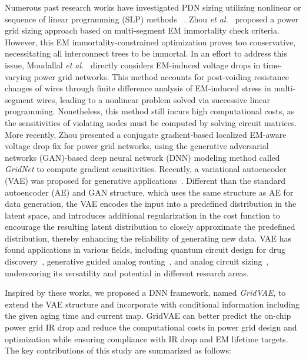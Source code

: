 Numerous past research works have investigated PDN sizing utilizing nonlinear or sequence of linear programming (SLP) methods
 ~\cite{ChBr:TCAD'88,DuMa:DAC'89,Tan:DAC'99,Wang:TCAD'05,ZhouSun:TVLSI'19, Sukharev:2019pg,ZhouYu:ASPDAC'20,ZhouJin:ICCAD'20}.
 Zhou {\it et al.}~\cite{ZhouSun:TVLSI'19,ZhouChen:Integration'21} proposed a power grid sizing approach based on multi-segment EM immortality check criteria. However, this EM immortality-constrained optimization proves too conservative, necessitating all interconnect trees to be immortal. In an effort to address this issue, Moudallal {\it et al.}~\cite{Sukharev:2019pg} directly considers EM-induced voltage drops in time-varying power grid networks. This method accounts for post-voiding resistance changes of wires through finite difference analysis of EM-induced stress in multi-segment wires, leading to a nonlinear problem solved via successive linear programming. Nonetheless, this method still incurs high computational costs, as the sensitivities of violating nodes must be computed by solving circuit matrices. More recently, Zhou \cite{ HanLiu:TCAD'22-23} presented a conjugate gradient-based localized EM-aware voltage drop fix for power grid networks, using the generative adversarial networks (GAN)-based deep neural network (DNN) modeling method called {\it GridNet} to compute gradient sensitivities.
Recently, a variational autoencoder (VAE) was proposed for generative applications~\cite{Diederik:arxiv'22}. Different than the standard autoencoder (AE) and GAN structure, which uses the same structure as AE for data generation, the VAE encodes the input into a predefined distribution in the latent space, and introduces additional regularization in the cost function to encourage the resulting latent distribution to closely approximate the predefined distribution, thereby enhancing the reliability of generating new data. VAE has found applications in various fields, including quantum circuit design for drug discovery~\cite{Li:DATE'22}, generative guided analog routing~\cite{Zhu:ICCAD'19}, and analog circuit sizing~\cite{Touloupas:SMACD'22}, underscoring its versatility and potential in different research areas.

Inspired by these works, we proposed a DNN framework, named {\it GridVAE}, to extend the VAE structure and incorporate with conditional information including the given aging time and current map. GridVAE can better predict the on-chip power grid IR drop and reduce the computational costs in power grid design and optimization while ensuring compliance with IR drop and EM lifetime targets.
The key contributions of this study are summarized as follows:

